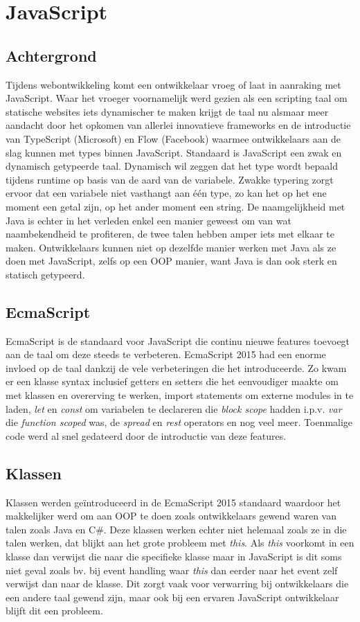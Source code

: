 \section{JavaScript}
\subsection{Achtergrond}
Tijdens webontwikkeling komt een ontwikkelaar vroeg of laat in aanraking met JavaScript. Waar het vroeger voornamelijk werd gezien als een scripting taal om statische websites iets dynamischer te maken krijgt de taal nu alsmaar meer aandacht door het opkomen van allerlei innovatieve frameworks en de introductie van TypeScript (Microsoft) en Flow (Facebook) waarmee ontwikkelaars aan de slag kunnen met types binnen JavaScript. Standaard is JavaScript een zwak en dynamisch getypeerde taal. Dynamisch wil zeggen dat het type wordt bepaald tijdens runtime op basis van de aard van de variabele. Zwakke typering zorgt ervoor dat een variabele niet vasthangt aan één type, zo kan het op het ene moment een getal zijn, op het ander moment een string. De naamgelijkheid met Java is echter in het verleden enkel een manier geweest om van wat naambekendheid te profiteren, de twee talen hebben amper iets met elkaar te maken. Ontwikkelaars kunnen niet op dezelfde manier werken met Java als ze doen met JavaScript, zelfs op een OOP manier, want Java is dan ook sterk en statisch getypeerd. 

\subsection{EcmaScript}
EcmaScript is de standaard voor JavaScript die continu nieuwe features toevoegt aan de taal om deze steeds te verbeteren. EcmaScript 2015 had een enorme invloed op de taal dankzij de vele verbeteringen die het introduceerde. Zo kwam er een klasse syntax inclusief getters en setters die het eenvoudiger maakte om met klassen en overerving te werken, import statements om externe modules in te laden, \textit{let} en \textit{const} om variabelen te declareren die \textit{block scope} hadden i.p.v. \textit{var} die \textit{function scoped} was, de \textit{spread} en \textit{rest} operators en nog veel meer. Toenmalige code werd al snel gedateerd door de introductie van deze features.

\subsection{Klassen}
Klassen werden geïntroduceerd in de EcmaScript 2015 standaard waardoor het makkelijker werd om aan OOP te doen zoals ontwikkelaars gewend waren van talen zoals Java en C\#. Deze klassen werken echter niet helemaal zoals ze in die talen werken, dat blijkt aan het grote probleem met \textit{this}. Als \textit{this} voorkomt in een klasse dan verwijst die naar die specifieke klasse maar in JavaScript is dit soms niet geval zoals bv. bij event handling waar \textit{this} dan eerder naar het event zelf verwijst dan naar de klasse. Dit zorgt vaak voor verwarring bij ontwikkelaars die een andere taal gewend zijn, maar ook bij een ervaren JavaScript ontwikkelaar blijft dit een probleem.

